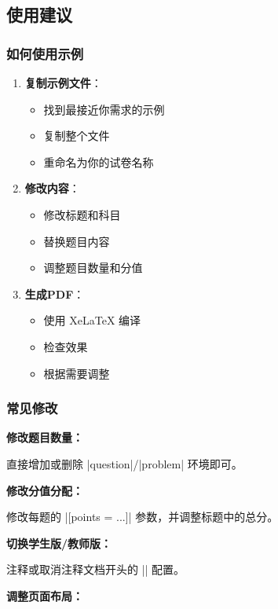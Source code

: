\subsection{使用建议}

\subsubsection{如何使用示例}

\begin{enumerate}
  \item \textbf{复制示例文件}：
    \begin{itemize}
      \item 找到最接近你需求的示例
      \item 复制整个文件
      \item 重命名为你的试卷名称
    \end{itemize}

  \item \textbf{修改内容}：
    \begin{itemize}
      \item 修改标题和科目
      \item 替换题目内容
      \item 调整题目数量和分值
    \end{itemize}

  \item \textbf{生成PDF}：
    \begin{itemize}
      \item 使用 XeLaTeX 编译
      \item 检查效果
      \item 根据需要调整
    \end{itemize}
\end{enumerate}

\subsubsection{常见修改}

\textbf{修改题目数量：}

直接增加或删除 |question|/|problem| 环境即可。

\textbf{修改分值分配：}

修改每题的 |[points = ...]| 参数，并调整标题中的总分。

\textbf{切换学生版/教师版：}

注释或取消注释文档开头的 |\examsetup| 配置。

\textbf{调整页面布局：}


